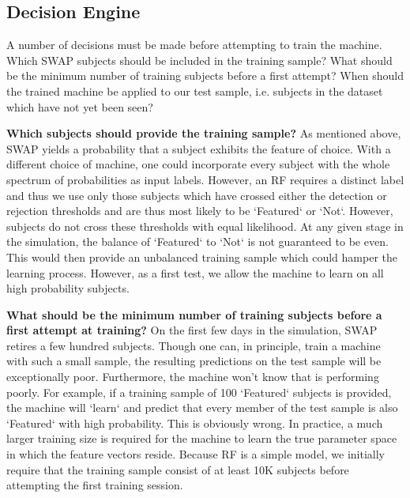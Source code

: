\documentclass[twocolumn]{aastex6}
\begin{document}
\subsection{Decision Engine}
A number of decisions must be made before attempting to train the machine. 
Which SWAP subjects should be included in the training sample? 
What should be the minimum number of training subjects before a first attempt?
When should the trained machine be applied to our test sample, i.e. subjects
in the dataset which have not yet been seen? 

\textbf{Which subjects should provide the training sample?} As mentioned above, SWAP
yields a probability that a subject exhibits the feature of choice. With a 
different choice of machine, one could incorporate every subject with the
whole spectrum of probabilities as input labels. However, an RF requires a
distinct label and thus we use only those subjects which have crossed either
the detection or rejection thresholds and are thus most likely to be `Featured`
or `Not`.  However, subjects do not cross these thresholds  with equal likelihood. 
At any given stage in the simulation, the balance of `Featured` to `Not` is not
guaranteed to be even. This would then provide an unbalanced training sample
which could hamper the learning process. However, as a first test, we allow
the machine to learn on all high probability subjects. 

\textbf{What should be the minimum number of training subjects before a first attempt at training?}
On the first few days in the simulation, SWAP retires a few hundred subjects.
Though one can, in principle, train a machine with such a small sample, the resulting
predictions on the test sample will be exceptionally poor. Furthermore, the machine
won't know that is performing poorly. For example, if a training sample of 100 `Featured`
subjects is provided, the machine will `learn` and predict that every member of the 
test sample is also `Featured` with high probability. This is obviously wrong. 
In practice, a much larger training size is required for the machine to learn the 
true parameter space in which the feature vectors reside. Because RF is a simple
model, we initially require that the training sample consist of at least 10K subjects
before attempting the first training session. 
\end{document}
